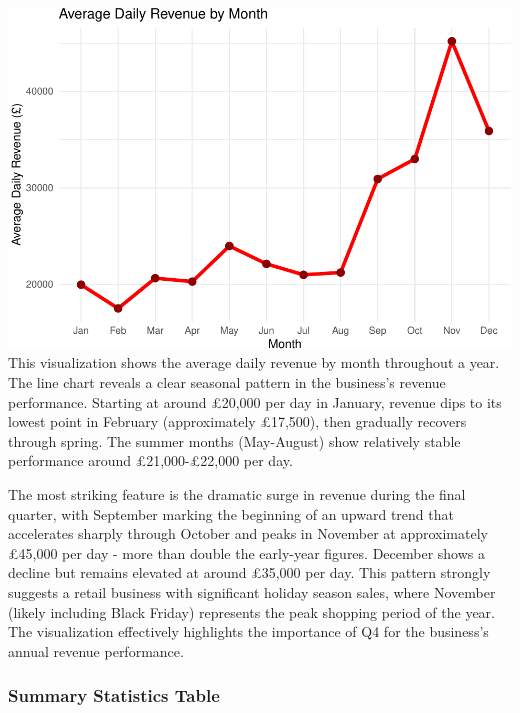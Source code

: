 \documentclass[
]{article}
\begin{document}
\includegraphics{capstone_customer_segmentation_files/figure-latex/exploratory-data-analysis13-1.pdf}
This visualization shows the average daily revenue by month throughout a
year. The line chart reveals a clear seasonal pattern in the business's
revenue performance. Starting at around £20,000 per day in January,
revenue dips to its lowest point in February (approximately £17,500),
then gradually recovers through spring. The summer months (May-August)
show relatively stable performance around £21,000-£22,000 per day.

The most striking feature is the dramatic surge in revenue during the
final quarter, with September marking the beginning of an upward trend
that accelerates sharply through October and peaks in November at
approximately £45,000 per day - more than double the early-year figures.
December shows a decline but remains elevated at around £35,000 per day.
This pattern strongly suggests a retail business with significant
holiday season sales, where November (likely including Black Friday)
represents the peak shopping period of the year. The visualization
effectively highlights the importance of Q4 for the business's annual
revenue performance.\newpage

\subsubsection{Summary Statistics Table}\label{summary-statistics-table}
\end{document}

